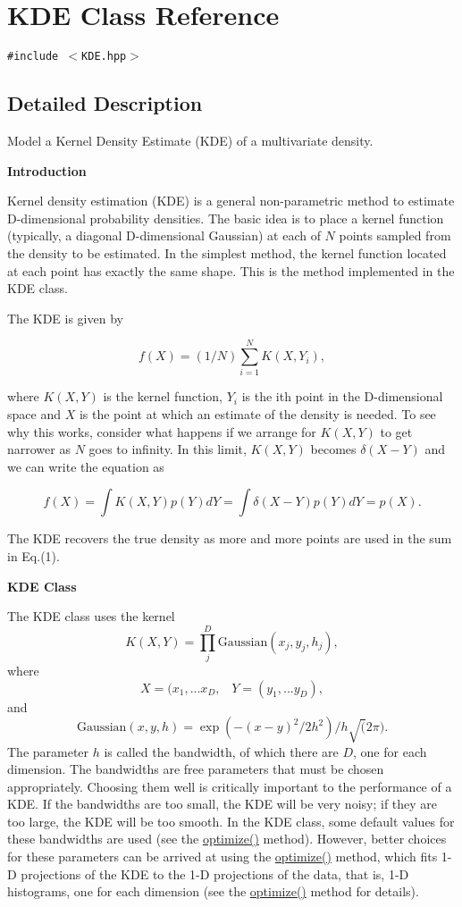 \hypertarget{classKDE}{
\section{KDE Class Reference}
\label{classKDE}
}
{\tt \#include $<$KDE.hpp$>$}



\subsection{Detailed Description}
Model a Kernel Density Estimate (KDE) of a multivariate density. 

{\bf Introduction} 

Kernel density estimation (KDE) is a general non-parametric method to estimate D-dimensional probability densities. The basic idea is to place a kernel function (typically, a diagonal D-dimensional Gaussian) at each of $N$ points sampled from the density to be estimated. In the simplest method, the kernel function located at each point has exactly the same shape. This is the method implemented in the KDE class. 

The KDE is given by

\[ f(X) = (1/N) \sum_{i=1}^N K(X,Y_i), \]

where $K(X,Y)$ is the kernel function, $Y_i$ is the ith point in the D-dimensional space and $X$ is the point at which an estimate of the density is needed. To see why this works, consider what happens if we arrange for $K(X,Y)$ to get narrower as $N$ goes to infinity. In this limit, $K(X,Y)$ becomes $\delta(X-Y)$ and we can write the equation as

\[ f(X) = \int K(X,Y) p(Y) dY = \int \delta(X-Y) p(Y) dY = p(X). \]

The KDE recovers the true density as more and more points are used in the sum in Eq.(1).

{\bf KDE Class}

The KDE class uses the kernel \[ K(X,Y) = \prod_j^D \mbox{Gaussian}(x_j, y_j, h_j), \] where \[ X = (x_1,...x_D, \;\;\; Y = (y_1,...y_D), \] and \[ \mbox{Gaussian}(x, y, h) = \exp(-(x-y)^2/2 h^2)/h\sqrt(2 \pi). \] The parameter $h$ is called the bandwidth, of which there are $D$, one for each dimension. The bandwidths are free parameters that must be chosen appropriately. Choosing them well is critically important to the performance of a KDE. If the bandwidths are too small, the KDE will be very noisy; if they are too large, the KDE will be too smooth. In the KDE class, some default values for these bandwidths are used (see the \hyperlink{classKDE_a7}{optimize()} method). However, better choices for these parameters can be arrived at using the \hyperlink{classKDE_a7}{optimize()} method, which fits 1-D projections of the KDE to the 1-D projections of the data, that is, 1-D histograms, one for each dimension (see the \hyperlink{classKDE_a7}{optimize()} method for details). 

